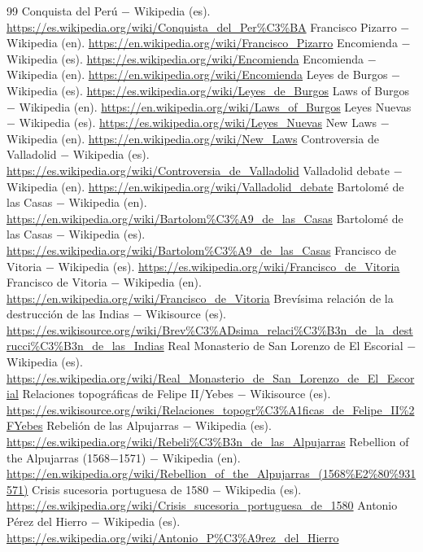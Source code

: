 \documentclass{book}
\begin{document}
\begin{thebibliography}{99}
 Conquista del Perú \(-\) Wikipedia (es). \url{https://es.wikipedia.org/wiki/Conquista_del_Per%C3%BA}
 Francisco Pizarro \(-\) Wikipedia (en). \url{https://en.wikipedia.org/wiki/Francisco_Pizarro}
 Encomienda \(-\) Wikipedia (es). \url{https://es.wikipedia.org/wiki/Encomienda}
 Encomienda \(-\) Wikipedia (en). \url{https://en.wikipedia.org/wiki/Encomienda}
 Leyes de Burgos \(-\) Wikipedia (es). \url{https://es.wikipedia.org/wiki/Leyes_de_Burgos}
 Laws of Burgos \(-\) Wikipedia (en). \url{https://en.wikipedia.org/wiki/Laws_of_Burgos}
 Leyes Nuevas \(-\) Wikipedia (es). \url{https://es.wikipedia.org/wiki/Leyes_Nuevas}
 New Laws \(-\) Wikipedia (en). \url{https://en.wikipedia.org/wiki/New_Laws}
 Controversia de Valladolid \(-\) Wikipedia (es). \url{https://es.wikipedia.org/wiki/Controversia_de_Valladolid}
 Valladolid debate \(-\) Wikipedia (en). \url{https://en.wikipedia.org/wiki/Valladolid_debate}
 Bartolomé de las Casas \(-\) Wikipedia (en). \url{https://en.wikipedia.org/wiki/Bartolom%C3%A9_de_las_Casas}
 Bartolomé de las Casas \(-\) Wikipedia (es). \url{https://es.wikipedia.org/wiki/Bartolom%C3%A9_de_las_Casas}
 Francisco de Vitoria \(-\) Wikipedia (es). \url{https://es.wikipedia.org/wiki/Francisco_de_Vitoria}
 Francisco de Vitoria \(-\) Wikipedia (en). \url{https://en.wikipedia.org/wiki/Francisco_de_Vitoria}
 Brevísima relación de la destrucción de las Indias \(-\) Wikisource (es). \url{https://es.wikisource.org/wiki/Brev%C3%ADsima_relaci%C3%B3n_de_la_destrucci%C3%B3n_de_las_Indias}
 Real Monasterio de San Lorenzo de El Escorial \(-\) Wikipedia (es). \url{https://es.wikipedia.org/wiki/Real_Monasterio_de_San_Lorenzo_de_El_Escorial}
 Relaciones topográficas de Felipe II/Yebes \(-\) Wikisource (es). \url{https://es.wikisource.org/wiki/Relaciones_topogr%C3%A1ficas_de_Felipe_II%2FYebes}
 Rebelión de las Alpujarras \(-\) Wikipedia (es). \url{https://es.wikipedia.org/wiki/Rebeli%C3%B3n_de_las_Alpujarras}
 Rebellion of the Alpujarras (1568\(-\)1571) \(-\) Wikipedia (en). \url{https://en.wikipedia.org/wiki/Rebellion_of_the_Alpujarras_(1568%E2%80%931571)}
 Crisis sucesoria portuguesa de 1580 \(-\) Wikipedia (es). \url{https://es.wikipedia.org/wiki/Crisis_sucesoria_portuguesa_de_1580}
 Antonio Pérez del Hierro \(-\) Wikipedia (es). \url{https://es.wikipedia.org/wiki/Antonio_P%C3%A9rez_del_Hierro}

\end{thebibliography}
\end{document}
